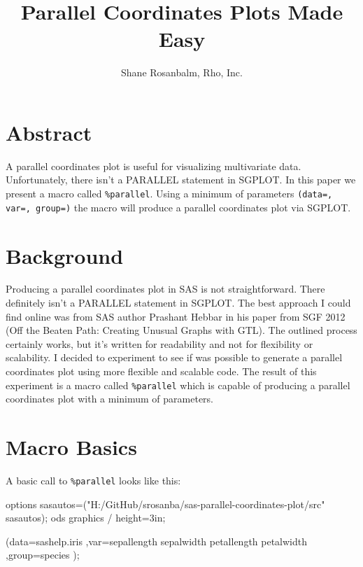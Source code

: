 \documentclass[9pt]{article}
\title{Parallel Coordinates Plots Made Easy}
\author{Shane Rosanbalm, Rho, Inc.}
\date{\vspace{-5ex}}
\begin{document}
\maketitle

\section*{Abstract}

A parallel coordinates plot is useful for visualizing multivariate data. Unfortunately, there isn't a PARALLEL statement in SGPLOT. In this paper we present a macro called \texttt{\%parallel}. Using a minimum of parameters \texttt{(data=, var=, group=)} the macro will produce a parallel coordinates plot via SGPLOT. 

\section*{Background}

Producing a parallel coordinates plot in SAS is not straightforward. There definitely isn't a PARALLEL statement in SGPLOT. The best approach I could find online was from SAS author Prashant Hebbar in his paper from SGF 2012 (Off the Beaten Path: Creating Unusual Graphs with GTL). The outlined process certainly works, but it's written for readability and not for flexibility or scalability. I decided to experiment to see if was possible to generate a parallel coordinates plot using more flexible and scalable code. The result of this experiment is a macro called \texttt{\%parallel} which is capable of producing a parallel coordinates plot with a minimum of parameters.

\section*{Macro Basics}

A basic call to \texttt{\%parallel} looks like this: \\

\begin{Sascode}[program]
options sasautos=("H:/GitHub/srosanba/sas-parallel-coordinates-plot/src" sasautos);
ods graphics / height=3in;
\end{Sascode}

\begin{Sascode}[store=basics]
   (data=sashelp.iris
   ,var=sepallength sepalwidth petallength petalwidth
   ,group=species
   );
\end{Sascode}
\end{document}
